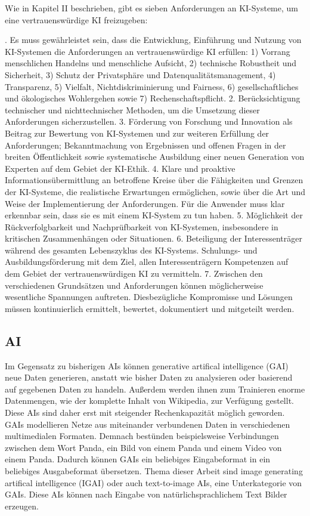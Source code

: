 \documentclass[12pt]{article}
\begin{document}
Wie in Kapitel II beschrieben, gibt es sieben Anforderungen an KI-Systeme, um eine vertrauenswürdige KI freizugeben:

. Es muss gewährleistet sein, dass die Entwicklung, Einführung und Nutzung von KI-Systemen die Anforderungen an vertrauenswürdige KI erfüllen:
1) Vorrang menschlichen Handelns und menschliche Aufsicht, 2) technische Robustheit und Sicherheit, 3) Schutz der Privatsphäre und Datenqualitätsmanagement, 4) Transparenz, 5) Vielfalt, Nichtdiskriminierung und Fairness, 6) gesellschaftliches und ökologisches Wohlergehen sowie 7) Rechenschaftspflicht. 
2. Berücksichtigung technischer und nichttechnischer Methoden, um die Umsetzung dieser Anforderungen sicherzustellen. 
3. Förderung von Forschung und Innovation als Beitrag zur Bewertung von KI-Systemen und zur weiteren Erfüllung der Anforderungen; Bekanntmachung von Ergebnissen und offenen Fragen in der breiten Öffentlichkeit sowie systematische Ausbildung einer neuen Generation von Experten auf dem Gebiet der KI-Ethik. 
4. Klare und proaktive Informationsübermittlung an betroffene Kreise über die Fähigkeiten und Grenzen der KI-Systeme, die realistische Erwartungen ermöglichen, sowie über die Art und Weise der Implementierung der Anforderungen. Für die Anwender muss klar erkennbar sein, dass sie es mit einem KI-System zu tun haben. 
5. Möglichkeit der Rückverfolgbarkeit und Nachprüfbarkeit von KI-Systemen, insbesondere in kritischen Zusammenhängen oder Situationen. 
6. Beteiligung der Interessenträger während des gesamten Lebenszyklus des KI-Systems. Schulungs- und Ausbildungsförderung mit dem Ziel, allen Interessenträgern Kompetenzen auf dem Gebiet der vertrauenswürdigen KI zu vermitteln. 
7. Zwischen den verschiedenen Grundsätzen und Anforderungen können möglicherweise wesentliche Spannungen auftreten. Diesbezügliche Kompromisse und Lösungen müssen kontinuierlich ermittelt, bewertet, dokumentiert und mitgeteilt werden.\grqq{}


\subsection{AI}
Im Gegensatz zu bisherigen AIs können generative artifical intelligence (GAI) neue Daten generieren, anstatt wie bisher Daten zu analysieren oder basierend auf gegebenen Daten zu handeln. Außerdem werden ihnen zum Trainieren enorme Datenmengen, wie der komplette Inhalt von Wikipedia, zur Verfügung gestellt. Diese AIs sind daher erst mit steigender Rechenkapazität möglich geworden. GAIs modellieren Netze aus miteinander verbundenen Daten in verschiedenen multimedialen Formaten. Demnach bestünden beispielsweise Verbindungen zwischen dem Wort Panda, ein Bild von einem Panda und einem Video von einem Panda. Dadurch können GAIs ein beliebiges Eingabeformat in ein beliebiges Ausgabeformat übersetzen. Thema dieser Arbeit sind image generating 
artifical intelligence (IGAI) oder auch text-to-image AIs, eine Unterkategorie von GAIs. Diese AIs können nach Eingabe von natürlichsprachlichem Text Bilder erzeugen.
\end{document}
